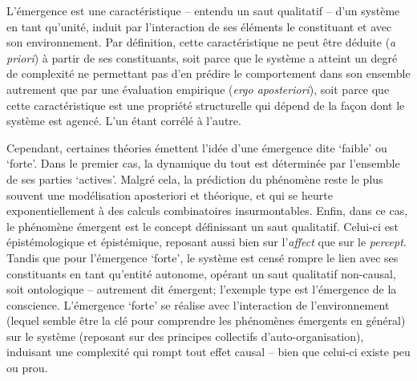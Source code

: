 \documentclass{article}
\begin{document}
 L'émergence est une caractéristique -- entendu un saut qualitatif -- d'un système en tant qu'unité, induit par l'interaction de ses éléments le constituant et avec son environnement. Par définition, cette caractéristique ne peut être déduite (\textit{a priori}) à partir de ses constituants, soit parce que le système a atteint un degré de complexité ne permettant pas d'en prédire le comportement dans son ensemble autrement que par une évaluation empirique (\textit{ergo aposteriori}), soit parce que cette caractéristique est une propriété structurelle qui dépend de la façon dont le système est agencé. 
 L'un étant corrélé à l'autre.

Cependant, certaines théories émettent l'idée d'une émergence dite `faible' ou `forte'. Dans le premier cas, la dynamique du tout est déterminée par l'ensemble de ses parties `actives'. Malgré cela, la prédiction du phénomène reste le plus souvent une modélisation aposteriori et théorique, et qui se heurte exponentiellement à des calculs combinatoires insurmontables. Enfin, dans ce cas, le phénomène émergent est le concept définissant un saut qualitatif. Celui-ci est épistémologique et épistémique, reposant aussi bien sur l'\textit{affect} que sur le \textit{percept}. Tandis que pour l'émergence `forte', le système est censé rompre le lien avec ses constituants en tant qu'entité autonome, opérant un saut qualitatif non-causal, soit ontologique -- autrement dit émergent; l'exemple type est l'émergence de la conscience. L'émergence `forte' se réalise avec l'interaction de l'environnement (lequel semble être la clé pour comprendre les phénomènes émergents en général) sur le système (reposant sur des principes collectifs d'auto-organisation), induisant une complexité qui rompt tout effet causal -- bien que celui-ci existe peu ou prou.
%  
%
%
%
\end{document}
